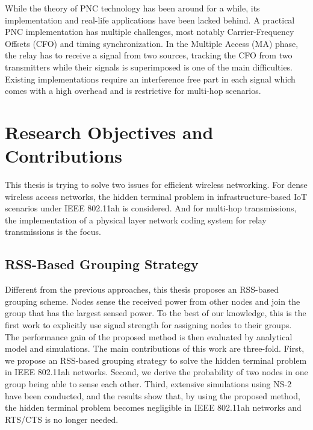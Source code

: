 While the theory of PNC technology has been around for a while, its implementation and real-life applications have been lacked behind. A practical PNC implementation has multiple challenges, most notably Carrier-Frequency Offsets (CFO) and timing synchronization. In the Multiple Access (MA) phase, the relay has to receive a signal from two sources, tracking the CFO from two transmitters while their signals is superimposed is one of the main difficulties. Existing implementations require an interference free part in each signal which comes with a high overhead and is restrictive for multi-hop scenarios.


\section{Research Objectives and Contributions}
This thesis is trying to solve two issues for efficient wireless networking. For dense wireless access networks, the hidden terminal problem in infrastructure-based IoT scenarios under IEEE 802.11ah is considered. And for multi-hop transmissions, the implementation of a physical layer network coding system for relay transmissions is the focus.

\subsection{RSS-Based Grouping Strategy}


Different from the previous approaches, this thesis proposes an RSS-based grouping scheme.
Nodes sense the received power from other nodes and join the group that has the largest sensed power. To the best of our knowledge, this is the first work to explicitly use signal strength for assigning nodes to their groups. The performance gain of the proposed method is then evaluated by analytical model and simulations. \iffalse CHECK THIS \fi The main contributions of this work are three-fold. First, we propose an RSS-based grouping strategy to solve the hidden terminal problem in IEEE 802.11ah networks. Second, we derive the probability of two nodes in one group being able to sense each other. Third, extensive simulations using NS-2\cite{breslau2000advances} have been conducted, and the results show that, by using the proposed method, the hidden terminal problem becomes negligible in IEEE 802.11ah networks and RTS/CTS is no longer needed.


